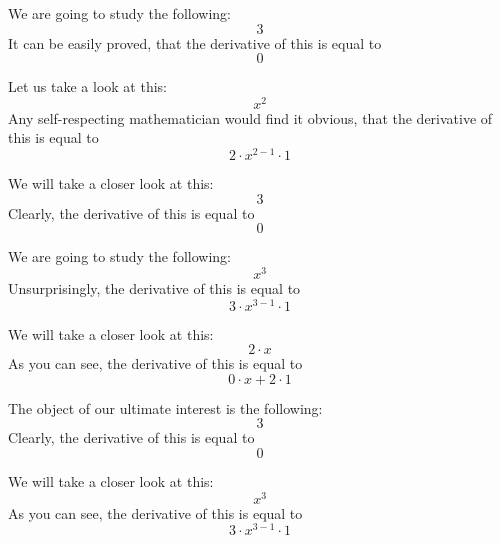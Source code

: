 \documentclass{article}
\begin{document}
We are going to study the following:
\begin{equation}
3 
\end{equation}
It can be easily proved, that the derivative of this is equal to
\begin{equation}
0 
\end{equation}

Let us take a look at this:
\begin{equation}
x ^{2 } 
\end{equation}
Any self-respecting mathematician would find it obvious, that the derivative of this is equal to
\begin{equation}
2 \cdot x ^{2 - 1 } \cdot 1 
\end{equation}

We will take a closer look at this:
\begin{equation}
3 
\end{equation}
Clearly, the derivative of this is equal to
\begin{equation}
0 
\end{equation}

We are going to study the following:
\begin{equation}
x ^{3 } 
\end{equation}
Unsurprisingly, the derivative of this is equal to
\begin{equation}
3 \cdot x ^{3 - 1 } \cdot 1 
\end{equation}

We will take a closer look at this:
\begin{equation}
2 \cdot x 
\end{equation}
As you can see, the derivative of this is equal to
\begin{equation}
0 \cdot x + 2 \cdot 1 
\end{equation}

The object of our ultimate interest is the following:
\begin{equation}
3 
\end{equation}
Clearly, the derivative of this is equal to
\begin{equation}
0 
\end{equation}

We will take a closer look at this:
\begin{equation}
x ^{3 } 
\end{equation}
As you can see, the derivative of this is equal to
\begin{equation}
3 \cdot x ^{3 - 1 } \cdot 1 
\end{equation}
\end{document}
